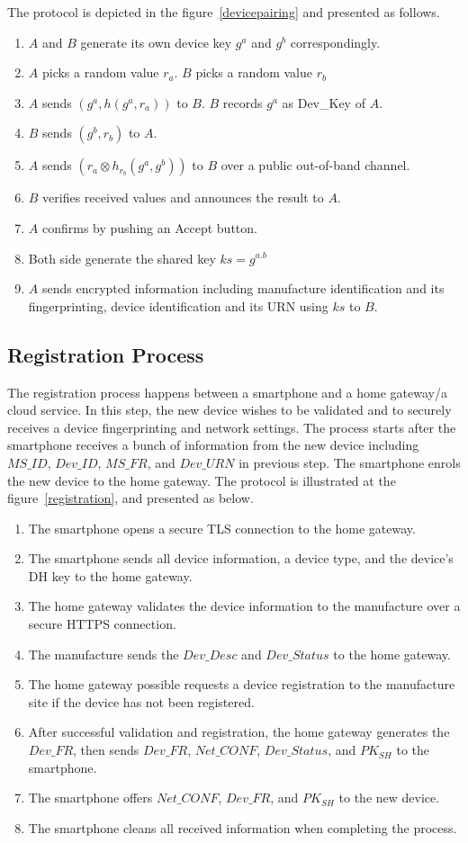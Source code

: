 The protocol is depicted in the figure~\ref{devicepairing} and presented as follows. 
\begin{enumerate}
\item $A$ and $B$ generate its own device key $g^a$ and $g^b$ correspondingly. 
\item $A$ picks a random value $r_a$. $B$ picks a random value $r_b$
\item $A$ sends $(g^a,h(g^a,r_a))$ to $B$. $B$ records $g^a$ as Dev\_Key of $A$. 
\item $B$ sends $(g^b,r_b)$ to $A$.
\item $A$ sends $(r_a \otimes h_{r_b}(g^a,g^b) )$ to $B$ over a public out-of-band channel. 
\item $B$ verifies received values and announces the result to $A$. 
\item $A$ confirms by pushing an Accept button. 
\item Both side generate the shared key $ks = g^{a.b}$
\item $A$ sends encrypted information including manufacture identification and its fingerprinting, device identification and its URN using $ks$ to $B$. 
\end{enumerate}

\subsection{Registration Process}

The registration process happens between a smartphone and a home gateway/a cloud service. In this step, the new device wishes to be validated and to securely receives a device fingerprinting and network settings. The process starts after the smartphone receives a bunch of information from the new device including $MS\_ID$, $Dev\_ID$, $MS\_FR$, and $Dev\_URN$ in previous step. The smartphone enrols the new device to the home gateway. The protocol is illustrated at the figure~\ref{registration}, and presented as below.
\begin{enumerate}
\item The smartphone opens a secure TLS connection to the home gateway.
\item The smartphone sends all device information, a device type, and the device's DH key to the home gateway. 
\item The home gateway validates the device information to the manufacture  over a secure HTTPS connection. 
\item The manufacture sends the $Dev\_Desc$ and $Dev\_Status$ to the home gateway.
\item The home gateway possible requests a device registration to the manufacture site if the device has not been registered. 
\item After successful validation and registration, the home gateway generates the $Dev\_FR$, then sends $Dev\_FR$, $Net\_CONF$, $Dev\_Status$, and $PK_{SH}$ to the smartphone. 
\item The smartphone offers $Net\_CONF$, $Dev\_FR$, and $PK_{SH}$ to the new device.
\item The smartphone cleans all received information when completing the process. 
\end{enumerate}

